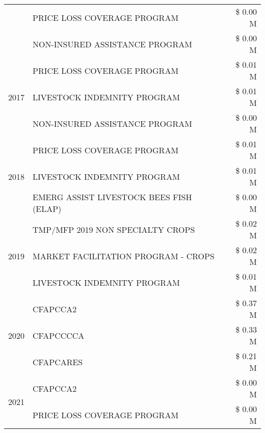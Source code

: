 \begin{tabular}{llr}
 & PRICE LOSS COVERAGE PROGRAM & \$ 0.00 M \\
 & NON-INSURED ASSISTANCE PROGRAM & \$ 0.00 M \\
\cline{1-3}
\multirow[t]{3}{*}{2017} & PRICE LOSS COVERAGE PROGRAM & \$ 0.01 M \\
 & LIVESTOCK INDEMNITY PROGRAM & \$ 0.01 M \\
 & NON-INSURED ASSISTANCE PROGRAM & \$ 0.00 M \\
\cline{1-3}
\multirow[t]{3}{*}{2018} & PRICE LOSS COVERAGE PROGRAM & \$ 0.01 M \\
 & LIVESTOCK INDEMNITY PROGRAM & \$ 0.01 M \\
 & EMERG ASSIST LIVESTOCK BEES FISH (ELAP) & \$ 0.00 M \\
\cline{1-3}
\multirow[t]{3}{*}{2019} & TMP/MFP 2019 NON SPECIALTY CROPS & \$ 0.02 M \\
 & MARKET FACILITATION PROGRAM - CROPS & \$ 0.02 M \\
 & LIVESTOCK INDEMNITY PROGRAM & \$ 0.01 M \\
\cline{1-3}
\multirow[t]{3}{*}{2020} & CFAPCCA2 & \$ 0.37 M \\
 & CFAPCCCCA & \$ 0.33 M \\
 & CFAPCARES & \$ 0.21 M \\
\cline{1-3}
\multirow[t]{2}{*}{2021} & CFAPCCA2 & \$ 0.00 M \\
 & PRICE LOSS COVERAGE PROGRAM & \$ 0.00 M \\
\cline{1-3}
\bottomrule
\end{tabular}

